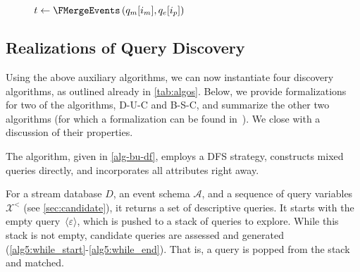 \begin{figure}[t]
\begin{algorithm}[H]
{        $t \leftarrow \FMergeEvents\left(q_m[i_m], q_e[i_p]\right)$\;
	    \label{alg4:const_pat_end}
    }



    \BlankLine

\end{algorithm}
\vspace{-1em}
\end{figure}



\subsection{Realizations of Query Discovery}
\label{sec:realizations}

Using the above auxiliary algorithms, we can now instantiate four
discovery algorithms, as outlined already in \autoref{tab:algos}. Below, we
provide formalizations for two of the algorithms, D-U-C and B-S-C, and
summarize the other two algorithms (for which a formalization can be found
in~\cite{disces_TR}). We close with a
discussion of their properties.

The algorithm, given in \autoref{alg-bu-df},
employs a DFS strategy, constructs mixed queries directly, and incorporates
all attributes right away.

For a stream
database $D$, an event schema
$\mathcal{A}$, and
a sequence of query variables $\mathcal{X}^<$ (see
\autoref{sec:candidate}),
it returns a set of descriptive queries. 
It starts with the
empty query~$\langle \varepsilon\rangle$, which is pushed to a stack of
queries to explore.
While this stack is not empty, candidate queries are assessed and generated
(\autoref{alg5:while_start}-\ref{alg5:while_end}). That is, a query is
popped from
the stack and matched.

